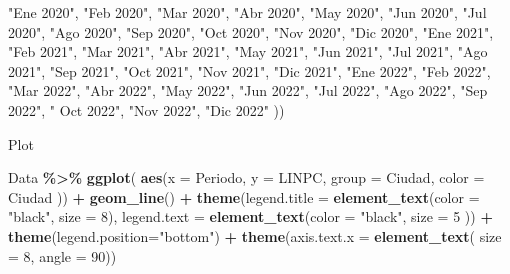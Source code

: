 \documentclass[
]{book}
\newenvironment{Shaded}{\begin{snugshade}}{\end{snugshade}}
\newcommand{\AttributeTok}[1]{\textcolor[rgb]{0.13,0.29,0.53}{#1}}
\newcommand{\DecValTok}[1]{\textcolor[rgb]{0.00,0.00,0.81}{#1}}
\newcommand{\FunctionTok}[1]{\textcolor[rgb]{0.13,0.29,0.53}{\textbf{#1}}}
\newcommand{\NormalTok}[1]{#1}
\newcommand{\SpecialCharTok}[1]{\textcolor[rgb]{0.81,0.36,0.00}{\textbf{#1}}}
\newcommand{\StringTok}[1]{\textcolor[rgb]{0.31,0.60,0.02}{#1}}
\begin{document}
\begin{Shaded}
\begin{Highlighting}[]
                                   \StringTok{"Ene 2020"}\NormalTok{, }\StringTok{"Feb 2020"}\NormalTok{, }\StringTok{"Mar 2020"}\NormalTok{, }
                                   \StringTok{"Abr 2020"}\NormalTok{, }\StringTok{"May 2020"}\NormalTok{, }\StringTok{"Jun 2020"}\NormalTok{,}
                                   \StringTok{"Jul 2020"}\NormalTok{, }\StringTok{"Ago 2020"}\NormalTok{, }\StringTok{"Sep 2020"}\NormalTok{, }
                                   \StringTok{"Oct 2020"}\NormalTok{, }\StringTok{"Nov 2020"}\NormalTok{, }\StringTok{"Dic 2020"}\NormalTok{,}
                                   \StringTok{"Ene 2021"}\NormalTok{, }\StringTok{"Feb 2021"}\NormalTok{, }\StringTok{"Mar 2021"}\NormalTok{, }
                                   \StringTok{"Abr 2021"}\NormalTok{, }\StringTok{"May 2021"}\NormalTok{, }\StringTok{"Jun 2021"}\NormalTok{,}
                                   \StringTok{"Jul 2021"}\NormalTok{, }\StringTok{"Ago 2021"}\NormalTok{, }\StringTok{"Sep 2021"}\NormalTok{, }
                                   \StringTok{"Oct 2021"}\NormalTok{, }\StringTok{"Nov 2021"}\NormalTok{, }\StringTok{"Dic 2021"}\NormalTok{,}
                                   \StringTok{"Ene 2022"}\NormalTok{, }\StringTok{"Feb 2022"}\NormalTok{, }\StringTok{"Mar 2022"}\NormalTok{, }
                                   \StringTok{"Abr 2022"}\NormalTok{, }\StringTok{"May 2022"}\NormalTok{, }\StringTok{"Jun 2022"}\NormalTok{,}
                                   \StringTok{"Jul 2022"}\NormalTok{, }\StringTok{"Ago 2022"}\NormalTok{, }\StringTok{"Sep 2022"}\NormalTok{, }\StringTok{"}
\StringTok{                                   Oct 2022"}\NormalTok{, }\StringTok{"Nov 2022"}\NormalTok{, }\StringTok{"Dic 2022"}\NormalTok{ ))}
\end{Highlighting}
\end{Shaded}

Plot

\begin{Shaded}
\begin{Highlighting}[]
\NormalTok{Data }\SpecialCharTok{\%\textgreater{}\%}
  \FunctionTok{ggplot}\NormalTok{( }\FunctionTok{aes}\NormalTok{(}\AttributeTok{x =}\NormalTok{ Periodo, }\AttributeTok{y =}\NormalTok{ LINPC, }\AttributeTok{group =}\NormalTok{ Ciudad, }\AttributeTok{color =}\NormalTok{ Ciudad )) }\SpecialCharTok{+}
        \FunctionTok{geom\_line}\NormalTok{() }\SpecialCharTok{+}
        \FunctionTok{theme}\NormalTok{(}\AttributeTok{legend.title =} \FunctionTok{element\_text}\NormalTok{(}\AttributeTok{color =} \StringTok{"black"}\NormalTok{, }\AttributeTok{size =} \DecValTok{8}\NormalTok{),}
          \AttributeTok{legend.text =} \FunctionTok{element\_text}\NormalTok{(}\AttributeTok{color =} \StringTok{"black"}\NormalTok{, }\AttributeTok{size =} \DecValTok{5}\NormalTok{ )) }\SpecialCharTok{+}
        \FunctionTok{theme}\NormalTok{(}\AttributeTok{legend.position=}\StringTok{"bottom"}\NormalTok{) }\SpecialCharTok{+}
        \FunctionTok{theme}\NormalTok{(}\AttributeTok{axis.text.x =} \FunctionTok{element\_text}\NormalTok{( }\AttributeTok{size =} \DecValTok{8}\NormalTok{, }\AttributeTok{angle =} \DecValTok{90}\NormalTok{))}
\end{Highlighting}
\end{Shaded}
\end{document}
